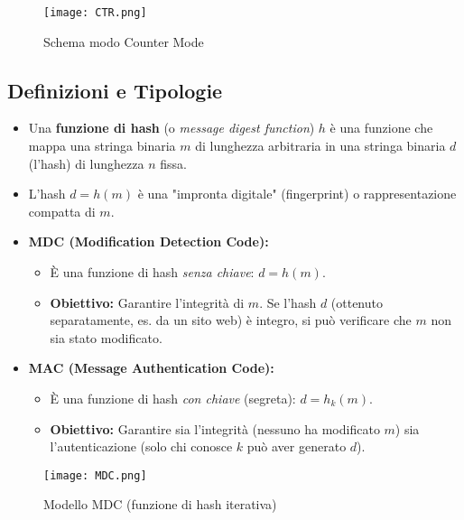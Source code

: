 \documentclass[../main.tex]{subfiles}
\begin{document}
\begin{itemize}
          \begin{figure}[H]
            \centering
            \texttt{[image: CTR.png]}
            \caption{Schema modo Counter Mode}
            \label{fig:etichetta}
          \end{figure}
\end{itemize}

\label{sec:funzioni-hash}

\subsection{Definizioni e Tipologie}
\begin{itemize}
    \item Una \textbf{funzione di hash} (o \emph{message digest function}) $h$ è una funzione che mappa una stringa binaria $m$ di lunghezza arbitraria in una stringa binaria $d$ (l'hash) di lunghezza $n$ fissa.
    \item L'hash $d=h(m)$ è una "impronta digitale" (fingerprint) o rappresentazione compatta di $m$.
    \item \textbf{MDC (Modification Detection Code):}
          \begin{itemize}
              \item È una funzione di hash \emph{senza chiave}: $d = h(m)$.
              \item \textbf{Obiettivo:} Garantire l'integrità di $m$. Se l'hash $d$ (ottenuto separatamente, es. da un sito web) è integro, si può verificare che $m$ non sia stato modificato.
          \end{itemize}
    \item \textbf{MAC (Message Authentication Code):}
          \begin{itemize}
              \item È una funzione di hash \emph{con chiave} (segreta): $d = h_k(m)$.
              \item \textbf{Obiettivo:} Garantire sia l'integrità (nessuno ha modificato $m$) sia l'autenticazione (solo chi conosce $k$ può aver generato $d$).
          \end{itemize}
\end{itemize}

\begin{figure}[H]
  \centering
  \texttt{[image: MDC.png]}
  \caption{Modello MDC (funzione di hash iterativa)}
  \label{fig:etichetta}
\end{figure}
\end{document}
